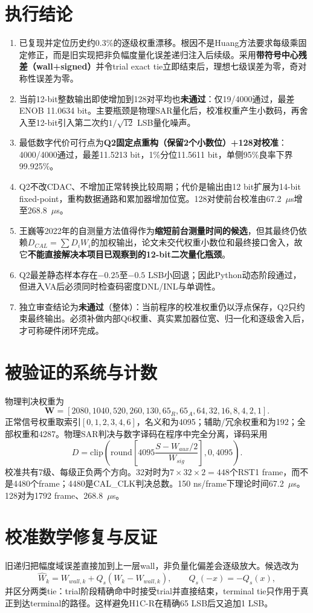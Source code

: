 \documentclass[UTF8,fontset=windows,a4paper,10.5pt]{ctexart}
\newcommand{\fail}{\textcolor{red!75!black}{\textbf{未通过}}}
\begin{document}
\section{执行结论}
\begin{enumerate}
\item 已复现并定位历史约$0.3\%$的逐级权重漂移。根因不是Huang方法要求每级乘固定修正，而是旧实现把非负幅度量化误差递归注入后续级。采用\textbf{带符号中心残差（wall+signed）}并令trial exact tie立即结束后，理想七级误差为零，奇对称性误差为零。
\item 当前12-bit整数输出即使增加到128对平均也\fail：仅19/4000通过，最差ENOB 11.0634 bit。主要瓶颈是物理SAR量化后，校准权重产生小数码，再舍入至12-bit引入第二次约$1/\sqrt{12}$ LSB量化噪声。
\item 最低数字代价可行点为\textbf{Q2固定点重构（保留2个小数位）+128对校准}：4000/4000通过，最差11.5213 bit，1\%分位11.5611 bit，单侧95\%良率下界99.925\%。
\item Q2不改CDAC、不增加正常转换比较周期；代价是输出由12 bit扩展为14-bit fixed-point，重构数据通路和累加器增加位宽。128对使前台校准由67.2~$\mu$s增至268.8~$\mu$s。
\item 王巍等2022年的自测量方法值得作为\textbf{缩短前台测量时间的候选}，但其最终仍依赖$D_{CAL}=\sum D_iW_i$的加权输出，论文未交代权重小数位和最终接口舍入，故它\textbf{不能直接解决本项目已观察到的12-bit二次量化瓶颈}。
\item Q2最差静态样本存在$-0.25$至$-0.5$ LSB小回退；因此Python动态阶段通过，但进入VA后必须同时检查码密度DNL/INL与单调性。
\item 独立审查结论为\fail（整体）：当前程序的校准权重仍以浮点保存，Q2只约束最终输出。必须补做内部Q6权重、真实累加器位宽、归一化和逐级舍入后，才可称硬件闭环完成。
\end{enumerate}

\section{被验证的系统与计数}
物理判决权重为
\[
\bm W=[2080,1040,520,260,130,65_R,65_A,64,32,16,8,4,2,1].
\]
正常信号权重取索引$[0,1,2,3,4,6]$，名义和为4095；辅助/冗余权重和为192；全部权重和4287。物理SAR判决与数字译码在程序中完全分离，译码采用
\[
D=\mathrm{clip}\!\left(\mathrm{round}\left[4095\frac{S-W_{aux}/2}{W_{sig}}\right],0,4095\right).
\]
校准共有7级、每级正负两个方向。32对时为$7\times32\times2=448$个RST1 frame，而不是4480个frame；4480是CAL\_CLK判决总数。150 ns/frame下理论时间67.2~$\mu$s。128对为1792 frame、268.8~$\mu$s。

\section{校准数学修复与反证}
旧递归把幅度域误差直接加到上一层wall，非负量化偏差会逐级放大。候选改为
\[
\widehat W_k=W_{wall,k}+Q_s(W_k-W_{wall,k}),\qquad Q_s(-x)=-Q_s(x),
\]
并区分两类tie：trial阶段精确命中时接受trial并直接结束，terminal tie只作用于真正到达terminal的路径。这样避免H1C-R在精确65 LSB后又追加1 LSB。
\end{document}
